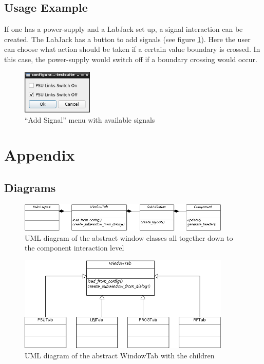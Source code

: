 \documentclass[10pt,a4paper]{article}
\begin{document}
	\subsection{Usage Example}
	
	If one has a power-supply and a LabJack set up, a signal interaction can be created. The LabJack has a button to add signals (see figure \ref{f:sem_menu}). Here the user can choose what action should be taken if a certain value boundary is crossed. In this case, the power-supply would switch off if a boundary crossing would occur.
	
	\begin{figure}[H]
	\centering
	\includegraphics[width=0.3\textwidth]{./5_sem_menu.png}
	\caption{\enquote{Add Signal} menu with available signals}
	\label{f:sem_menu}
	\end{figure}


\newpage
\appendix

\section{Appendix}

\subsection{Diagrams}

\begin{figure}[H]
\centering
\includegraphics[width=0.9\textwidth]{./A_MainLayout.png}
\caption{UML diagram of the abstract window classes all together down to the component interaction level}
\end{figure}

\begin{figure}[H]
\centering
\includegraphics[width=0.9\textwidth]{./A_WindowTabDiagramm.png}
\caption{UML diagram of the abstract WindowTab with the children}
\end{figure}
\end{document}
